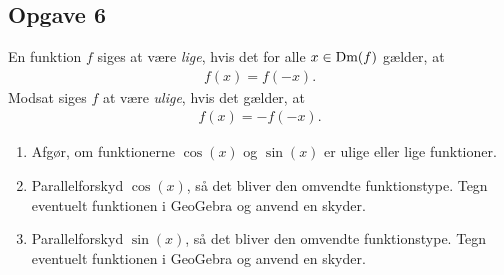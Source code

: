 \begin{center}
\end{center}

\subsection*{Opgave 6}
En funktion $f$ siges at være \textit{lige}, hvis det for alle $x \in \textnormal{Dm}(f)$ gælder, at
\begin{align*}
	f(x) = f(-x).
\end{align*}
Modsat siges $f$ at være \textit{ulige}, hvis det gælder, at
\begin{align*}
	f(x) = -f(-x).
\end{align*}
\begin{enumerate}[label=\roman*)]
	\item Afgør, om funktionerne $\cos(x)$ og $\sin(x)$ er ulige eller lige funktioner. 
	\item Parallelforskyd $\cos(x)$, så det bliver den omvendte funktionstype. Tegn eventuelt funktionen i 
	GeoGebra og anvend en skyder.
	\item Parallelforskyd $\sin(x)$, så det bliver den omvendte funktionstype. Tegn eventuelt funktionen i 
	GeoGebra og anvend en skyder.
\end{enumerate}